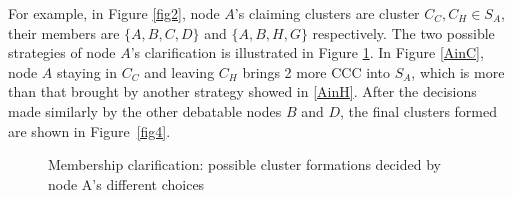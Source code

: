 For example, in Figure \ref{fig2}, node $A$'s claiming clusters are cluster $C_C, C_H\in S_A$, their members are $\{A,B,C,D\}$ and $\{A,B,H,G\}$ respectively. 
The two possible strategies of node $A$'s clarification is illustrated in Figure \ref{fig3}.
In Figure \ref{AinC}, node $A$ staying in $C_C$ and leaving $C_H$ brings 2 more CCC into $S_A$, which is more than that brought by another strategy showed in \ref{AinH}.
After the decisions made similarly by the other debatable nodes $B$ and $D$, the final clusters formed are shown in Figure~\ref{fig4}.



\begin{figure}[h]
\centering
{}
\caption[]{Membership clarification: possible cluster formations decided by node A's different choices} %
\label{fig3}
\end{figure}


